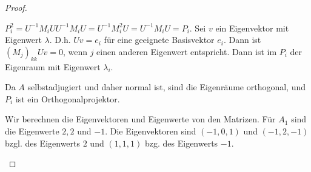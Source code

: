 \begin{proof}
	\begin{parts}
	\item $P_i^2=U^{-1}M_i U U^{-1}M_i U=U^{-1} M_i^2 U=U^{-1}M_iU=P_i$. Sei $v$ ein Eigenvektor mit Eigenwert $\lambda$. D.h. $Uv=e_i$ f\"{u}r eine geeignete Basisvektor $e_i$. Dann ist $(M_j)_{kk} Uv = 0$, wenn $j$ einen anderen Eigenwert entspricht. Dann ist $\text{im }P_i$ der Eigenraum mit Eigenwert $\lambda_i$.

		Da $A$ selbstadjugiert und daher normal ist, sind die Eigenräume orthogonal, und $P_i$ ist ein Orthogonalprojektor.
	\item Wir berechnen die Eigenvektoren und Eigenwerte von den Matrizen. F\"{u}r $A_1$ sind die Eigenwerte $2,2$ und $-1$. Die Eigenvektoren sind $(-1,0,1)$ und $(-1,2,-1)$ bzgl. des Eigenwerts $2$ und $(1,1,1)$ bzg. des Eigenwerts $-1$. 


\end{parts}
\end{proof}
